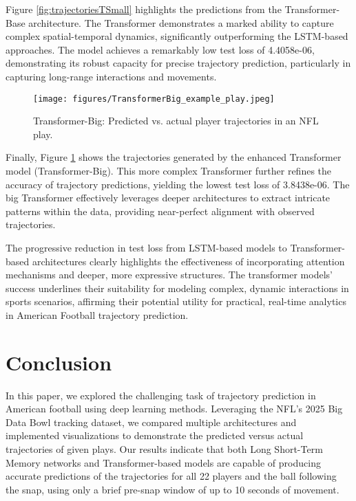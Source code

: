 \documentclass[sigconf]{acmart}
\begin{document}
Figure \ref{fig:trajectoriesTSmall} highlights the predictions from the Transformer-Base architecture. The Transformer demonstrates a marked ability to capture complex spatial-temporal dynamics, significantly outperforming the LSTM-based approaches. The model achieves a remarkably low test loss of 4.4058e-06, demonstrating its robust capacity for precise trajectory prediction, particularly in capturing long-range interactions and movements.

\begin{figure}[htbp]
  \centering
  \texttt{[image: figures/TransformerBig\_example\_play.jpeg]}
  \caption{Transformer-Big: Predicted vs. actual player trajectories in an NFL play.}
  \label{fig:trajectoriesTBig}
\end{figure}

Finally, Figure \ref{fig:trajectoriesTBig} shows the trajectories generated by the enhanced Transformer model (Transformer-Big). This more complex Transformer further refines the accuracy of trajectory predictions, yielding the lowest test loss of 3.8438e-06. The big Transformer effectively leverages deeper architectures to extract intricate patterns within the data, providing near-perfect alignment with observed trajectories.

The progressive reduction in test loss from LSTM-based models to Transformer-based architectures clearly highlights the effectiveness of incorporating attention mechanisms and deeper, more expressive structures. The transformer models' success underlines their suitability for modeling complex, dynamic interactions in sports scenarios, affirming their potential utility for practical, real-time analytics in American Football trajectory prediction.


\section{Conclusion}

In this paper, we explored the challenging task of trajectory prediction in American football using deep learning methods. Leveraging the NFL’s 2025 Big Data Bowl tracking dataset, we compared multiple architectures and implemented visualizations to demonstrate the predicted versus actual trajectories of given plays. Our results indicate that both Long Short-Term Memory networks and Transformer-based models are capable of producing accurate predictions of the trajectories for all 22 players and the ball following the snap, using only a brief pre-snap window of up to 10 seconds of movement. 
\end{document}

